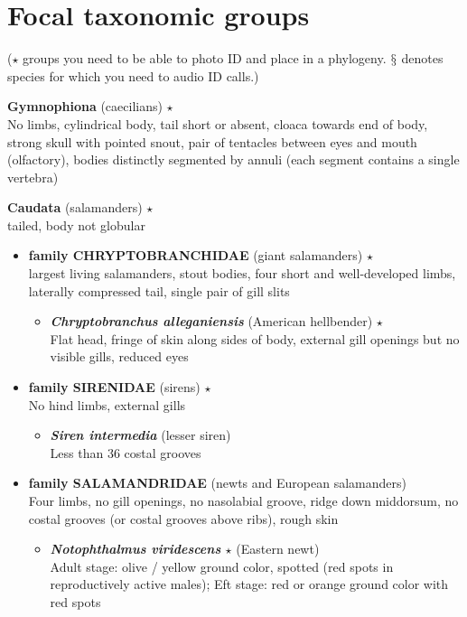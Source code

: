 \documentclass[a4paper,12pt]{article}
\begin{document}
\section*{Focal taxonomic groups} ($\star$ groups you need to be able to photo ID and place in a phylogeny. $\mathsection$ denotes species for which you need to audio ID calls.)
\begin{description}
\item{\textbf{Gymnophiona} (caecilians) $\star$} \\ No limbs, cylindrical body, tail short or absent, cloaca towards end of body, strong skull with pointed snout, pair of tentacles between eyes and mouth (olfactory), bodies distinctly segmented by annuli (each segment contains a single vertebra)
\item{\textbf{Caudata} (salamanders) $\star$} \\ tailed, body not globular
\begin{itemize}
  \item{\textbf{family CHRYPTOBRANCHIDAE} (giant salamanders) $\star$} \\ largest living salamanders, stout bodies, four short and well-developed limbs, laterally compressed tail, single pair of gill slits
  \begin{itemize}
    \item{\textbf{\textit{   Chryptobranchus alleganiensis}} (American hellbender) $\star$} \\ Flat head, fringe of skin along sides of body, external gill openings but no visible gills, reduced eyes
  \end{itemize}
  \item{\textbf{family SIRENIDAE} (sirens) $\star$} \\ No hind limbs, external gills
  \begin{itemize}
    \item{\textbf{\textit{   Siren intermedia}} (lesser siren)} \\ Less than 36 costal grooves
  \end{itemize}  
  \item{\textbf{family SALAMANDRIDAE} (newts and European salamanders)} \\ Four limbs, no gill openings, no nasolabial groove, ridge down middorsum, no costal grooves (or costal grooves above ribs), rough skin
  \begin{itemize}
    \item{\textbf{\textit{   Notophthalmus viridescens} $\star$} (Eastern newt)} \\ Adult stage: olive / yellow ground color, spotted (red spots in reproductively active males); Eft stage: red or orange ground color with red spots

\end{itemize}
\end{itemize}
\end{description}
\end{document}
